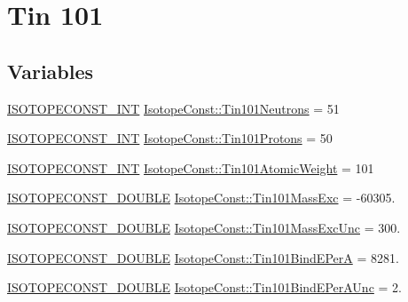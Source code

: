 \hypertarget{group___isotope_const-_tin-_sn101}{}\section{Tin 101}
\label{group___isotope_const-_tin-_sn101}
\subsection*{Variables}
\begin{DoxyCompactItemize}
\item 
\mbox{\hyperlink{group___isotope_const-_macros_ga5f18360b3e99483a35c32d789e62621c}{I\+S\+O\+T\+O\+P\+E\+C\+O\+N\+S\+T\+\_\+\+I\+NT}} \mbox{\hyperlink{group___isotope_const-_tin-_sn101_ga6bfe92a8bb418ecd28b31b00813a3460}{Isotope\+Const\+::\+Tin101\+Neutrons}} = 51
\item 
\mbox{\hyperlink{group___isotope_const-_macros_ga5f18360b3e99483a35c32d789e62621c}{I\+S\+O\+T\+O\+P\+E\+C\+O\+N\+S\+T\+\_\+\+I\+NT}} \mbox{\hyperlink{group___isotope_const-_tin-_sn101_ga186bba57ed2f3a39e8db40d48635bbf0}{Isotope\+Const\+::\+Tin101\+Protons}} = 50
\item 
\mbox{\hyperlink{group___isotope_const-_macros_ga5f18360b3e99483a35c32d789e62621c}{I\+S\+O\+T\+O\+P\+E\+C\+O\+N\+S\+T\+\_\+\+I\+NT}} \mbox{\hyperlink{group___isotope_const-_tin-_sn101_gad6178b1298130a6475e1e7071db2f641}{Isotope\+Const\+::\+Tin101\+Atomic\+Weight}} = 101
\item 
\mbox{\hyperlink{group___isotope_const-_macros_ga8f45a7272ce02c0b4c65c44636ed719a}{I\+S\+O\+T\+O\+P\+E\+C\+O\+N\+S\+T\+\_\+\+D\+O\+U\+B\+LE}} \mbox{\hyperlink{group___isotope_const-_tin-_sn101_ga697b26f2019996d0b6cfe18b393a654e}{Isotope\+Const\+::\+Tin101\+Mass\+Exc}} = -\/60305.
\item 
\mbox{\hyperlink{group___isotope_const-_macros_ga8f45a7272ce02c0b4c65c44636ed719a}{I\+S\+O\+T\+O\+P\+E\+C\+O\+N\+S\+T\+\_\+\+D\+O\+U\+B\+LE}} \mbox{\hyperlink{group___isotope_const-_tin-_sn101_gaa7d5e73cd08b7b59d4bc4a2613b45f6f}{Isotope\+Const\+::\+Tin101\+Mass\+Exc\+Unc}} = 300.
\item 
\mbox{\hyperlink{group___isotope_const-_macros_ga8f45a7272ce02c0b4c65c44636ed719a}{I\+S\+O\+T\+O\+P\+E\+C\+O\+N\+S\+T\+\_\+\+D\+O\+U\+B\+LE}} \mbox{\hyperlink{group___isotope_const-_tin-_sn101_ga16e8610873db833802546c284e14d30c}{Isotope\+Const\+::\+Tin101\+Bind\+E\+PerA}} = 8281.
\item 
\mbox{\hyperlink{group___isotope_const-_macros_ga8f45a7272ce02c0b4c65c44636ed719a}{I\+S\+O\+T\+O\+P\+E\+C\+O\+N\+S\+T\+\_\+\+D\+O\+U\+B\+LE}} \mbox{\hyperlink{group___isotope_const-_tin-_sn101_gaddeceb21889f310b43cc8c44f9d3890a}{Isotope\+Const\+::\+Tin101\+Bind\+E\+Per\+A\+Unc}} = 2.

\end{DoxyCompactItemize}

